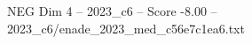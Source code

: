 \begin{textsample}{NEG Dim 4 – 2023\_c6 – Score -8.00 – 2023\_c6/enade\_2023\_med\_c56e7c1ea6.txt}
\end{textsample}
